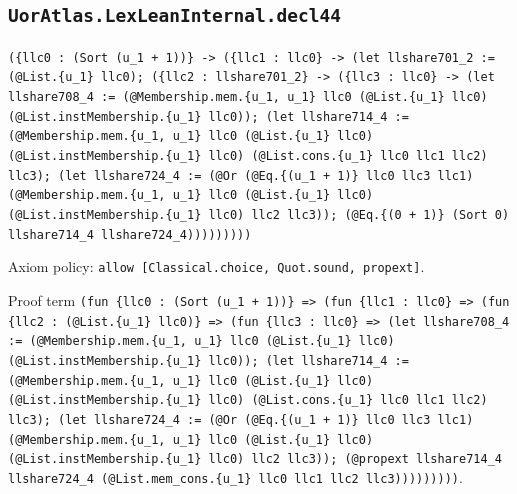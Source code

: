\documentclass[11pt]{article}
\begin{document}
\subsection*{\texttt{UorAtlas.LexLeanInternal.decl44}}
\noindent\texttt{(\{llc0 : (Sort (u\_1 + 1))\} -> (\{llc1 : llc0\} -> (let llshare701\_2 := (@List.\{u\_1\} llc0); (\{llc2 : llshare701\_2\} -> (\{llc3 : llc0\} -> (let llshare708\_4 := (@Membership.mem.\{u\_1, u\_1\} llc0 (@List.\{u\_1\} llc0) (@List.instMembership.\{u\_1\} llc0)); (let llshare714\_4 := (@Membership.mem.\{u\_1, u\_1\} llc0 (@List.\{u\_1\} llc0) (@List.instMembership.\{u\_1\} llc0) (@List.cons.\{u\_1\} llc0 llc1 llc2) llc3); (let llshare724\_4 := (@Or (@Eq.\{(u\_1 + 1)\} llc0 llc3 llc1) (@Membership.mem.\{u\_1, u\_1\} llc0 (@List.\{u\_1\} llc0) (@List.instMembership.\{u\_1\} llc0) llc2 llc3)); (@Eq.\{(0 + 1)\} (Sort 0) llshare714\_4 llshare724\_4)))))))))}\par
\noindent Axiom policy: \texttt{allow [Classical.choice, Quot.sound, propext]}.\par
\noindent Proof term \texttt{(fun \{llc0 : (Sort (u\_1 + 1))\} => (fun \{llc1 : llc0\} => (fun \{llc2 : (@List.\{u\_1\} llc0)\} => (fun \{llc3 : llc0\} => (let llshare708\_4 := (@Membership.mem.\{u\_1, u\_1\} llc0 (@List.\{u\_1\} llc0) (@List.instMembership.\{u\_1\} llc0)); (let llshare714\_4 := (@Membership.mem.\{u\_1, u\_1\} llc0 (@List.\{u\_1\} llc0) (@List.instMembership.\{u\_1\} llc0) (@List.cons.\{u\_1\} llc0 llc1 llc2) llc3); (let llshare724\_4 := (@Or (@Eq.\{(u\_1 + 1)\} llc0 llc3 llc1) (@Membership.mem.\{u\_1, u\_1\} llc0 (@List.\{u\_1\} llc0) (@List.instMembership.\{u\_1\} llc0) llc2 llc3)); (@propext llshare714\_4 llshare724\_4 (@List.mem\_cons.\{u\_1\} llc0 llc1 llc2 llc3)))))))))}.\par
\end{document}
